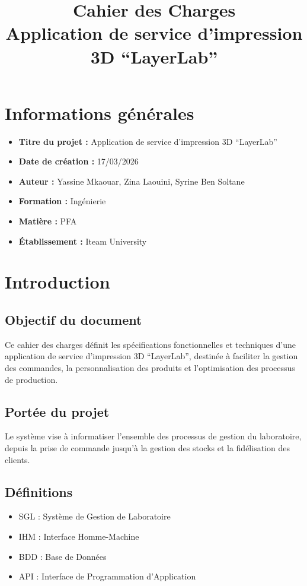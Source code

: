 \documentclass[12pt,a4paper]{article}
\title{\textbf{Cahier des Charges}\\
Application de service d'impression 3D ``LayerLab''}
\date{}
\begin{document}
\maketitle

\section*{Informations générales}

\begin{itemize}
\item \textbf{Titre du projet :} Application de service d'impression 3D ``LayerLab''
\item \textbf{Date de création :} 17/03/2026
\item \textbf{Auteur :} Yassine Mkaouar, Zina Laouini, Syrine Ben Soltane
\item \textbf{Formation :} Ingénierie 
\item \textbf{Matière :} PFA
\item \textbf{Établissement :} Iteam University 
\end{itemize}

\section{Introduction}

\subsection{Objectif du document}

Ce cahier des charges définit les spécifications fonctionnelles et techniques d'une application de service d'impression 3D ``LayerLab'', destinée à faciliter la gestion des commandes, la personnalisation des produits et l'optimisation des processus de production. 

\subsection{Portée du projet}

Le système vise à informatiser l'ensemble des processus de gestion du laboratoire, depuis la prise de commande jusqu'à la gestion des stocks et la fidélisation des clients.

\subsection{Définitions}

\begin{itemize}
\item SGL : Système de Gestion de Laboratoire
\item IHM : Interface Homme-Machine
\item BDD : Base de Données
\item API : Interface de Programmation d'Application
\end{itemize}
\end{document}
